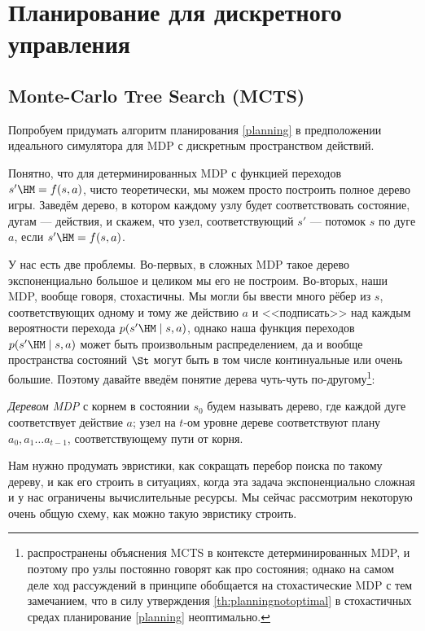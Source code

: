 \section{Планирование для дискретного управления}\label{mctssection}

\subsection{Monte-Carlo Tree Search (MCTS)}

Попробуем придумать алгоритм планирования \eqref{planning} в предположении идеального симулятора для MDP с дискретным пространством действий.

Понятно, что для детерминированных MDP с функцией переходов $s' \HM= f(s, a)$, чисто теоретически, мы можем просто построить полное дерево игры. Заведём дерево, в котором каждому узлу будет соответствовать состояние, дугам --- действия, и скажем, что узел, соответствующий $s'$ --- потомок $s$ по дуге $a$, если $s' \HM= f(s, a)$.

У нас есть две проблемы. Во-первых, в сложных MDP такое дерево экспоненциально большое и целиком мы его не построим. Во-вторых, наши MDP, вообще говоря, стохастичны. Мы могли бы ввести много рёбер из $s$, соответствующих одному и тому же действию $a$ и <<подписать>> над каждым вероятности перехода $p(s' \HM\mid s, a)$, однако наша функция переходов $p(s' \HM\mid s, a)$ может быть произвольным распределением, да и вообще пространства состояний $\St$ могут быть в том числе континуальные или очень большие. Поэтому давайте введём понятие дерева чуть-чуть по-другому\footnote{распространены объяснения MCTS в контексте детерминированных MDP, и поэтому про узлы постоянно говорят как про состояния; однако на самом деле ход рассуждений в принципе обобщается на стохастические MDP с тем замечанием, что в силу утверждения \ref{th:planningnotoptimal} в стохастичных средах планирование \eqref{planning} неоптимально.}:

\begin{definition}
\emph{Деревом MDP} с корнем в состоянии $s_0$ будем называть дерево, где каждой дуге соответствует действие $a$; узел на $t$-ом уровне дереве соответствуют плану $a_0, a_1 \dots a_{t-1}$, соответствующему пути от корня.
\end{definition}

Нам нужно продумать эвристики, как сокращать перебор поиска по такому дереву, и как его строить в ситуациях, когда эта задача экспоненциально сложная и у нас ограничены вычислительные ресурсы. Мы сейчас рассмотрим некоторую очень общую схему, как можно такую эвристику строить.

